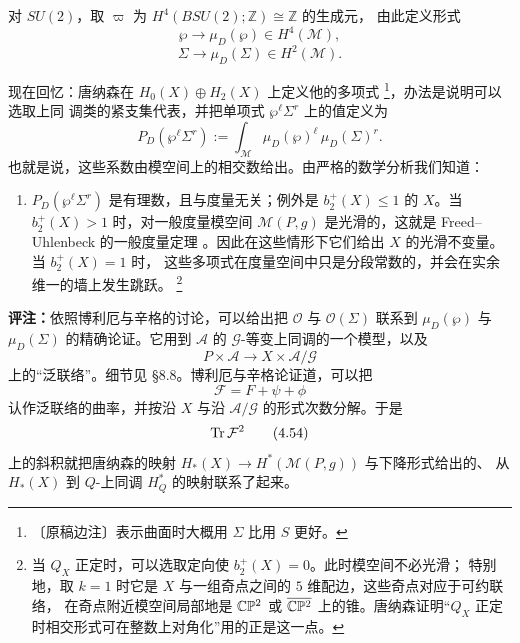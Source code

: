 对 $SU(2)$，取 $\varpi$ 为 $H^{4}(BSU(2);\mathbb{Z})\cong\mathbb{Z}$ 的生成元，
由此定义形式
\begin{equation}
  \wp\to\mu_{D}(\wp)\in H^{4}(\mathcal{M}),
  \tag{4.49}
\end{equation}
\begin{equation}
  \Sigma\to\mu_{D}(\Sigma)\in H^{2}(\mathcal{M}).
  \tag{4.50}
\end{equation}

现在回忆：唐纳森在 $H_{0}(X)\oplus H_{2}(X)$ 上定义他的多项式
\footnote{〔原稿边注〕表示曲面时大概用 $\Sigma$ 比用 $S$ 更好。}，办法是说明可以选取上同
调类的紧支集代表，并把单项式 $\wp^{\ell}\Sigma^{r}$ 上的值定义为
\begin{equation}
  P_{D}(\wp^{\ell}\Sigma^{r})
  :=\int_{\mathcal{M}}\mu_{D}(\wp)^{\ell}\,\mu_{D}(\Sigma)^{r}.
  \tag{4.51}
\end{equation}
也就是说，这些系数由模空间上的相交数给出。由严格的数学分析我们知道：

\begin{enumerate}[label=\arabic*., leftmargin=2.2em]
  \item $P_{D}(\wp^{\ell}\Sigma^{r})$ 是有理数，且与度量无关；例外是
    $b_{2}^{+}(X)\le1$ 的 $X$。当 $b_{2}^{+}(X)>1$ 时，对一般度量模空间
    $\mathcal{M}(P,g)$ 是光滑的，这就是 Freed--Uhlenbeck 的一般度量定理
    \cite{ref15}。因此在这些情形下它们给出 $X$ 的光滑不变量。当 $b_{2}^{+}(X)=1$ 时，
    这些多项式在度量空间中只是分段常数的，并会在实余维一的墙上发生跳跃。
    \footnote{当 $Q_{X}$ 正定时，可以选取定向使 $b_{2}^{+}(X)=0$。此时模空间不必光滑；
    特别地，取 $k=1$ 时它是 $X$ 与一组奇点之间的 $5$ 维配边，这些奇点对应于可约联络，
    在奇点附近模空间局部地是 $\mathbb{C}\mathbb{P}^{2}$ 或 $\overline{\mathbb{C}\mathbb{P}^{2}}$
    上的锥。唐纳森证明“$Q_{X}$ 正定时相交形式可在整数上对角化”用的正是这一点。}
\end{enumerate}

\textbf{评注：}依照博利厄与辛格的讨论，可以给出把 $\mathcal{O}$ 与
$\mathcal{O}(\Sigma)$ 联系到 $\mu_{D}(\wp)$ 与 $\mu_{D}(\Sigma)$ 的精确论证。它用到
$\mathcal{A}$ 的 $\mathcal{G}$-等变上同调的一个模型，以及
\begin{equation}
  P\times\mathcal{A}\to X\times\mathcal{A}/\mathcal{G}
  \tag{4.52}
\end{equation}
上的“泛联络”。细节见 \cite{ref4} §8.8。博利厄与辛格论证道，可以把
\begin{equation}
  \mathcal{F}=F+\psi+\phi
  \tag{4.53}
\end{equation}
认作泛联络的曲率，并按沿 $X$ 与沿 $\mathcal{A}/\mathcal{G}$ 的形式次数分解。于是
\begin{equation}
  \operatorname{Tr}\mathcal{F}^{2}
  \tag{4.54}
\end{equation}
上的斜积就把唐纳森的映射 $H_{*}(X)\to H^{*}(\mathcal{M}(P,g))$ 与下降形式给出的、
从 $H_{*}(X)$ 到 $Q$-上同调 $H^{*}_{Q}$ 的映射联系了起来。

